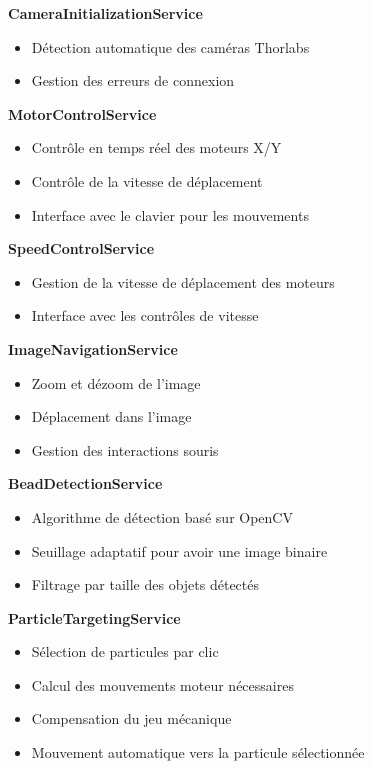 \textbf{CameraInitializationService}
\begin{itemize}[label=\textbullet]
    \item Détection automatique des caméras Thorlabs
    \item Gestion des erreurs de connexion
\end{itemize}

\textbf{MotorControlService}
\begin{itemize}[label=\textbullet]
    \item Contrôle en temps réel des moteurs X/Y
    \item Contrôle de la vitesse de déplacement
    \item Interface avec le clavier pour les mouvements
\end{itemize}

\textbf{SpeedControlService}
\begin{itemize}[label=\textbullet]
    \item Gestion de la vitesse de déplacement des moteurs
    \item Interface avec les contrôles de vitesse
\end{itemize}

\textbf{ImageNavigationService}
\begin{itemize}[label=\textbullet]
    \item Zoom et dézoom de l'image
    \item Déplacement dans l'image
    \item Gestion des interactions souris
\end{itemize}

\textbf{BeadDetectionService}
\begin{itemize}[label=\textbullet]
    \item Algorithme de détection basé sur OpenCV
    \item Seuillage adaptatif pour avoir une image binaire
    \item Filtrage par taille des objets détectés
\end{itemize}

\textbf{ParticleTargetingService}
\begin{itemize}[label=\textbullet]
    \item Sélection de particules par clic
    \item Calcul des mouvements moteur nécessaires
    \item Compensation du jeu mécanique
    \item Mouvement automatique vers la particule sélectionnée
\end{itemize}

